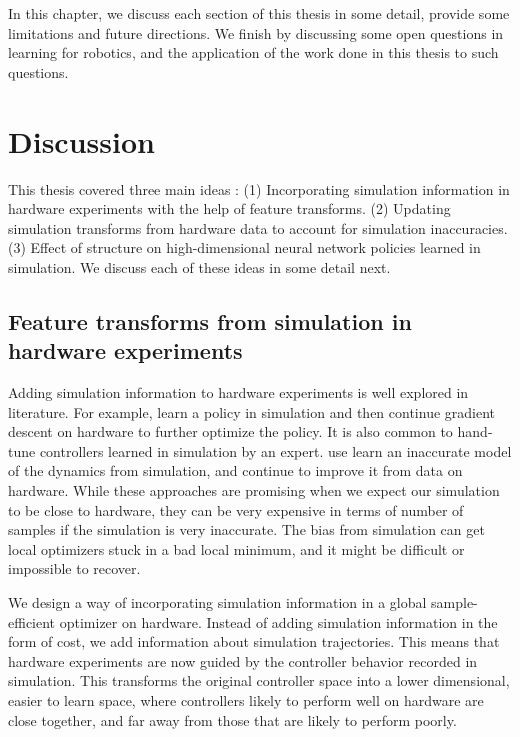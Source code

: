 In this chapter, we discuss each section of this thesis in some detail, provide some limitations and future directions. We finish by discussing some open questions in learning for robotics, and the application of the work done in this thesis to such questions.

\section{Discussion}
This thesis covered three main ideas : (1) Incorporating simulation information in hardware experiments with the help of feature transforms. (2) Updating simulation transforms from hardware data to account for simulation inaccuracies. (3) Effect of structure on high-dimensional neural network policies learned in simulation. We discuss each of these ideas in some detail next.

\subsection{Feature transforms from simulation in hardware experiments}

Adding simulation information to hardware experiments is well explored in literature. For example, \cite{endo2008learning} learn a policy in simulation and then continue gradient descent on hardware to further optimize the policy. It is also common to hand-tune controllers learned in simulation by an expert.  \cite{abbeel2006using} use learn an inaccurate model of the dynamics from simulation, and continue to improve it from data on hardware. While these approaches are promising when we expect our simulation to be close to hardware, they can be very expensive in terms of number of samples if the simulation is very inaccurate. The bias from simulation can get local optimizers stuck in a bad local minimum, and it might be difficult or impossible to recover.

We design a way of incorporating simulation information in a global sample-efficient optimizer on hardware. Instead of adding simulation information in the form of cost, we add information about simulation trajectories. This means that hardware experiments are now guided by the controller behavior recorded in simulation. This transforms the original controller space into a lower dimensional, easier to learn space, where controllers likely to perform well on hardware are close together, and far away from those that are likely to perform poorly.

